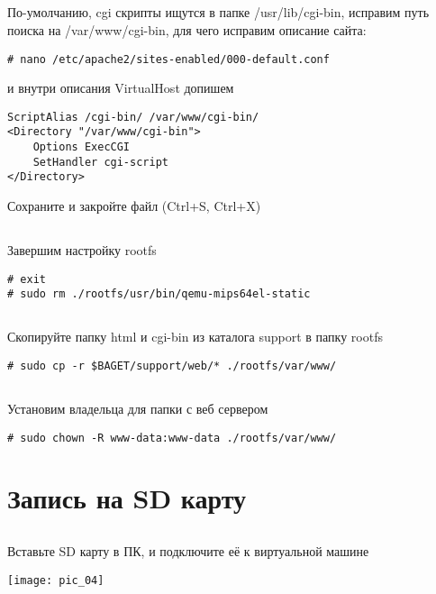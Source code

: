 \subsection{}По-умолчанию, cgi скрипты ищутся в папке /usr/lib/cgi-bin, исправим путь поиска на /var/www/cgi-bin, для чего исправим описание сайта:
\begin{lstlisting}[style=bash]
# nano /etc/apache2/sites-enabled/000-default.conf
\end{lstlisting}
и внутри описания VirtualHost допишем
\begin{lstlisting}[style=stdout]
ScriptAlias /cgi-bin/ /var/www/cgi-bin/
<Directory "/var/www/cgi-bin">
	Options ExecCGI
	SetHandler cgi-script
</Directory>
\end{lstlisting}
Сохраните и закройте файл (Ctrl+S, Ctrl+X)

\subsection{}Завершим настройку rootfs
\begin{lstlisting}[style=bash]
# exit
# sudo rm ./rootfs/usr/bin/qemu-mips64el-static
\end{lstlisting}

\subsection{}Скопируйте папку html и cgi-bin из каталога support в папку rootfs
\begin{lstlisting}[style=bash]
# sudo cp -r $BAGET/support/web/* ./rootfs/var/www/
\end{lstlisting}

\subsection{}Установим владельца для папки с веб сервером
\begin{lstlisting}[style=bash]
# sudo chown -R www-data:www-data ./rootfs/var/www/
\end{lstlisting}

\section{Запись на SD карту}

\subsection{}Вставьте SD карту в ПК, и подключите её к виртуальной машине
\begin{center}
	\texttt{[image: pic\_04]}
\end{center}

